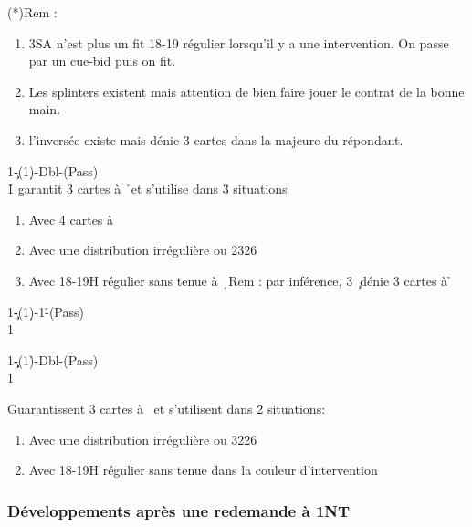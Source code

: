 \documentclass[a4paper]{article}
\begin{document}
(*)Rem :

\begin{enumerate}
\item 3SA n’est plus un fit 18-19 régulier lorsqu’il y a une intervention. On passe
par un cue-bid puis on fit.

\item Les splinters existent mais attention de bien faire jouer le contrat de la 
bonne main.

\item l’inversée existe mais dénie 3 cartes dans la majeure du répondant.

\end{enumerate}

\begin{bidtable}
1\c-(1\d)-Dbl-(Pass)\\
1\h \> garantit 3 cartes à \h\ et s’utilise dans 3 situations
\end{bidtable}

\begin{enumerate}
\item Avec 4 cartes à \s\ 

\item Avec une distribution irrégulière ou 2326

\item Avec 18-19H régulier sans tenue à \d\ 
Rem : par inférence, 3 \c\ dénie 3 cartes à \h 

\end{enumerate}

\begin{bidtable}
1\c-(1\d)-1\h-(Pass)\\
1\s
\end{bidtable}

\begin{bidtable}
1\c\d-(1\h)-Dbl-(Pass)\\
1\s
\end{bidtable}

Guarantissent 3 cartes à \s\ et s’utilisent dans 2 situations:

\begin{enumerate}
\item Avec une distribution irrégulière ou 3226

\item Avec 18-19H régulier sans tenue dans la couleur d’intervention

\end{enumerate}

\subsubsection{Développements après une redemande à 1NT}
\end{document}
